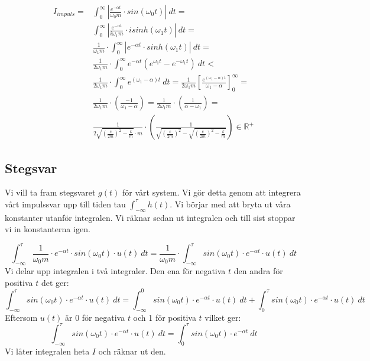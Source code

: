 \documentclass[10pt,a4paper]{article}
\begin{document}
\begin{itemize}
\begin{equation}
\begin{split}
I_{impuls}= & \int_{0}^{\infty}\left|\frac{e^{-\alpha t}}{\omega_0  m}\cdot sin(\omega_0 t)\right| \ dt=\\ & \int_{0}^{\infty}\left|\frac{e^{-\alpha t}}{i\omega_1 m}\cdot i sinh(\omega_1 t)\right| \ dt=\\ & \frac{1}{\omega_1  m} \cdot \int_{0}^{\infty}\left|e^{-\alpha t}\cdot sinh(\omega_1 t)\right| \ dt=\\ & \frac{1}{2 \omega_1  m} \cdot \int_{0}^{\infty}e^{-\alpha t} \left( e^{\omega_1 t}-e^{-\omega_1 t} \right) \ dt< \\ & \frac{1}{2\omega_1  m} \cdot \int_{0}^{\infty}e^{(\omega_1-\alpha) t} \  dt=\frac{1}{2\omega_1  m}\left[\frac{e^{(\omega_1-\alpha) t}}{\omega_1-\alpha} \right]_{0}^{\infty}=\\ & \frac{1}{2\omega_1  m}\cdot\left(\frac{-1}{\omega_1-\alpha} \right)=\frac{1}{2\omega_1  m} \cdot \left(\frac{1}{\alpha-\omega_1} \right)=\\ & \frac{1}{2 \sqrt{\left(\frac{c}{2 m}\right)^2-\frac{k}{m}}   \cdot m} \cdot \left(\frac{1}{\sqrt{\left(\frac{c}{2 m}\right)^2}-\sqrt{\left(\frac{c}{2 m}\right)^2-\frac{k}{m}}} \right)\in \mathbb{R}^+
\end{split}
\end{equation}
\end{itemize}

\newpage

\subsection{Stegsvar}

Vi vill ta fram stegsvaret $g(t)$ för vårt system. Vi gör detta genom att integrera vårt impulssvar upp till tiden tau $\int_{-\infty}^\tau h(t)$. Vi börjar med att bryta ut våra konstanter utanför integralen. Vi räknar sedan ut integralen och till sist stoppar vi in konstanterna igen.

\begin{equation}
\int_{-\infty}^\tau \frac{1} {\omega_0 m} \cdot e^{-\alpha  t} \cdot sin(\omega_0  t) \cdot u(t) \  dt = \frac{1}{\omega_0  m} \cdot \int_{-\infty}^\tau sin(\omega_0 t)\cdot e^{-\alpha  t} \cdot u(t) \  dt
\end{equation}
Vi delar upp integralen i två integraler. Den ena för negativa $t$ den andra för positiva $t$ det ger:
$$ \int_{-\infty}^\tau sin(\omega_0  t)\cdot e^{-\alpha t} \cdot u(t)  \ dt
= \int_{-\infty}^0 sin(\omega_0  t)\cdot e^{-\alpha  t} \cdot u(t) \  dt + \int_0^\tau sin(\omega_0  t)\cdot e^{-\alpha  t} \cdot u(t) \  dt $$
Eftersom $u(t)$ är 0 för negativa $t$ och 1 för positiva $t$ vilket ger:
\begin{equation}
\int_{-\infty}^\tau sin(\omega_0  t)\cdot e^{-\alpha  t} \cdot u(t) \  dt
= \int_0^\tau sin(\omega_0  t)\cdot e^{-\alpha t} \  dt
\end{equation}
Vi låter integralen heta $I$ och räknar ut den.
\end{document}

